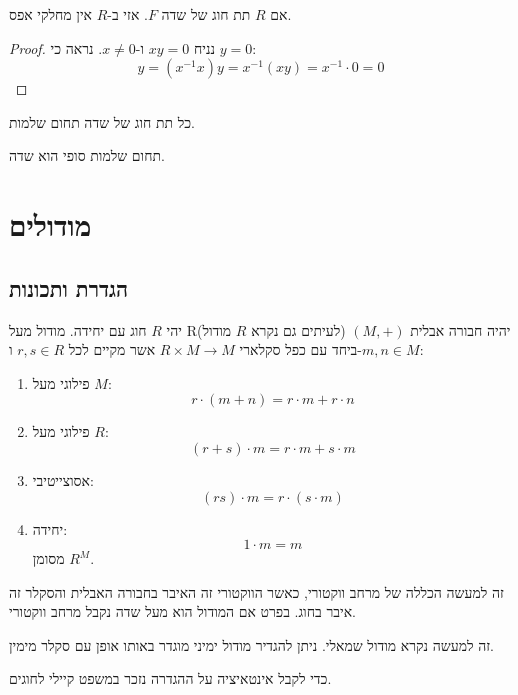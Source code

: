 \documentclass{tstextbook}
\begin{document}
\begin{proposition}
אם \(R\) תת חוג של שדה \(F\). אזי ב-\(R\) אין מחלקי אפס.

\end{proposition}
\begin{proof}
נניח \(xy=0\) ו-\(x\neq 0\). נראה כי \(y=0\):
$$y=\left(x^{-1}x\right)y=x^{-1}\left(x y\right)=x^{-1}\cdot0=0$$

\end{proof}
\begin{corollary}
כל תת חוג של שדה תחום שלמות.

\end{corollary}
\begin{proposition}
תחום שלמות סופי הוא שדה.

\end{proposition}
\section{מודולים}

\subsection{הגדרת ותכונות}

\begin{definition}[מודול]
יהי \(R\) חוג עם יחידה. מודול מעל R(לעיתים גם נקרא \(R\) מודול) יהיה חבורה אבלית \((M,+)\) ביחד עם כפל סקלארי \(R\times M\to M\) אשר מקיים לכל \(r,s \in R\) ו-\(m,n \in M\):

  \begin{enumerate}
    \item פילוגי מעל \(M\): 
$$r\cdot\left(m+n\right)=r\cdot m+r\cdot n$$


    \item פילוגי מעל \(R\): 
$$(r+s)\cdot m=r\cdot m+s\cdot m$$


    \item אסוצייטיבי: 
$$(rs)\cdot m=r\cdot(s\cdot m)$$


    \item יחידה: 
$$1\cdot m= m$$
מסומן \(R^{M}\).


  \end{enumerate}
\end{definition}
\begin{remark}
זה למעשה הכללה של מרחב ווקטורי, כאשר הווקטורי זה האיבר בחבורה האבלית והסקלר זה איבר בחוג. בפרט אם המודול הוא מעל שדה נקבל מרחב ווקטורי.

\end{remark}
\begin{remark}
זה למעשה נקרא מודול שמאלי. ניתן להגדיר מודול ימיני מוגדר באותו אופן עם סקלר מימין.

\end{remark}
כדי לקבל אינטאיציה על ההגדרה נזכר במשפט קיילי לחוגים.
\end{document}
